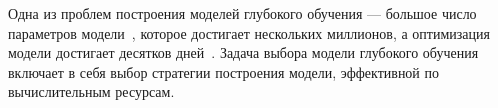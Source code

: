 \documentclass[12pt]{a&t}
\begin{document}



Одна из проблем построения моделей глубокого обучения --- большое число параметров модели~\cite{hinton_rbm}, которое достигает нескольких миллионов, а оптимизация модели достигает десятков дней~\cite{suts}. Задача выбора модели глубокого обучения включает в себя выбор стратегии построения модели, эффективной по вычислительным ресурсам. 


\end{document}
